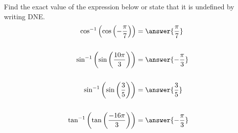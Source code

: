 \documentclass{ximera}
\author{Bobby Ramsey}
\begin{document}
\begin{exercise}


Find the exact value of the expression below or state that it is undefined by writing DNE.
\begin{align*}
	\cos^{-1}\left( \cos\left(-\frac{\pi}{7} \right) \right) &= \answer{\frac{\pi}{7}} \\ \\
	\sin^{-1}\left(\sin\left(\frac{10\pi}{3}\right)\right)&=\answer{-\frac{\pi}{3}}\\ \\
	\sin^{-1}\left( \sin\left( \frac{3}{5} \right) \right) &= \answer{\frac{3}{5}} \\ \\
	\tan^{-1}\left( \tan\left( \frac{-16\pi}{3} \right) \right) &= \answer{-\frac{\pi}{3}} 
\end{align*}


\end{exercise}
\end{document}
